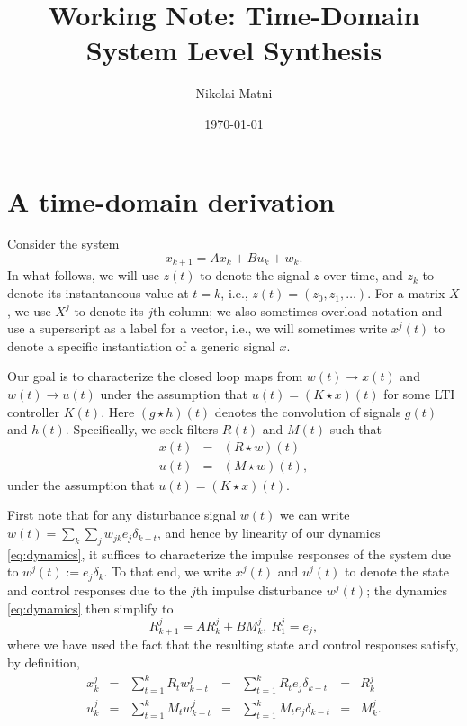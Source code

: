 \documentclass[11pt]{article}
\title{Working Note: Time-Domain System Level Synthesis}
\author{Nikolai Matni}
\date{\today}
\numberwithin{equation}{section}
\begin{document}
\maketitle

\section{A time-domain derivation}
Consider the system
\begin{equation}
x_{k+1} = Ax_k + Bu_k + w_k.
\label{eq:dynamics}
\end{equation}
In what follows, we will use $z(t)$ to denote the signal $z$ over time, and $z_k$ to denote its instantaneous value at $t=k$, i.e., $z(t) = (z_0,z_1,\dots)$.  For a matrix $X$, we use $X^j$ to denote its $j$th column; we also sometimes overload notation and use a superscript as a label for a vector, i.e., we will sometimes write $x^j(t)$ to denote a specific instantiation of a generic signal $x$.

Our goal is to characterize the closed loop maps from $w(t) \to x(t)$ and $w(t) \to u(t)$ under the assumption that $u(t) = (K\star x)(t)$ for some LTI controller $K(t)$.  Here $(g\star h)(t)$ denotes the convolution of signals $g(t)$ and $h(t)$.  Specifically, we seek filters $R(t)$ and $M(t)$ such that
\begin{equation}
\begin{array}{rcl}
x(t) &=& (R\star w)(t) \\
u(t) &=& (M\star w)(t),
\end{array}
\label{eq:responses}
\end{equation}
under the assumption that $u(t) = (K\star x)(t)$.

First note that for any disturbance signal $w(t)$ we can write $w(t) = \sum_k \sum_j w_{jk}e_j\delta_{k-t}$, and hence by linearity of our dynamics \eqref{eq:dynamics}, it suffices to characterize the impulse responses of the system due to $w^j(t):= e_j \delta_k$.  To that end, we write $x^j(t)$ and $u^j(t)$ to denote the state and control responses due to the $j$th impulse disturbance $w^j(t)$; the dynamics \eqref{eq:dynamics} then simplify to
\begin{equation}
R^j_{k+1} = AR^j_k + BM^j_k, \ R^j_1 = e_j,
\end{equation}
where we have used the fact that the resulting state and control responses satisfy, by definition,
\[
\begin{array}{rclclcl}
x^j_k &=& \sum_{t=1}^k R_tw^j_{k-t} &=& \sum_{t=1}^k R_te_j \delta_{k-t} &=& R^j_k \\
u^j_k &=& \sum_{t=1}^k M_tw^j_{k-t} &=& \sum_{t=1}^k M_te_j \delta_{k-t} &=& M^j_k.
\end{array}
\]
\end{document}
